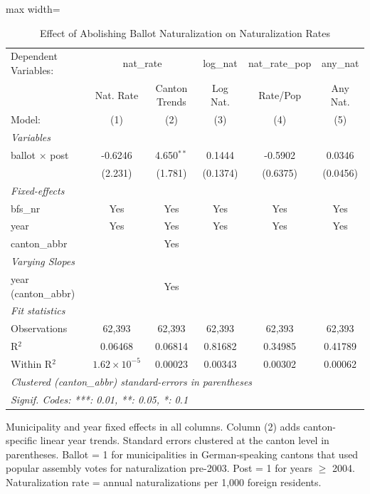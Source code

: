 
\begin{table}[htbp]
   \caption{\label{tab:main} Effect of Abolishing Ballot Naturalization on Naturalization Rates}
   \centering
   \begin{adjustbox}{max width=\textwidth}
   \begin{tabular}{lccccc}
      \tabularnewline \midrule \midrule
      Dependent Variables: & \multicolumn{2}{c}{nat\_rate} & log\_nat & nat\_rate\_pop & any\_nat\\
                            & Nat. Rate             & Canton Trends & Log Nat. & Rate/Pop & Any Nat. \\   
      Model:                & (1)                   & (2)           & (3)      & (4)      & (5)\\  
      \midrule
      \emph{Variables}\\
      ballot $\times$ post  & -0.6246               & 4.650$^{**}$  & 0.1444   & -0.5902  & 0.0346\\   
                            & (2.231)               & (1.781)       & (0.1374) & (0.6375) & (0.0456)\\   
      \midrule
      \emph{Fixed-effects}\\
      bfs\_nr               & Yes                   & Yes           & Yes      & Yes      & Yes\\  
      year                  & Yes                   & Yes           & Yes      & Yes      & Yes\\  
      canton\_abbr          &                       & Yes           &          &          & \\  
      \midrule
      \emph{Varying Slopes}\\
      year (canton\_abbr)   &                       & Yes           &          &          & \\  
      \midrule
      \emph{Fit statistics}\\
      Observations          & 62,393                & 62,393        & 62,393   & 62,393   & 62,393\\  
      R$^2$                 & 0.06468               & 0.06814       & 0.81682  & 0.34985  & 0.41789\\  
      Within R$^2$          & $1.62\times 10^{-5}$  & 0.00023       & 0.00343  & 0.00302  & 0.00062\\  
      \midrule \midrule
      \multicolumn{6}{l}{\emph{Clustered (canton\_abbr) standard-errors in parentheses}}\\
      \multicolumn{6}{l}{\emph{Signif. Codes: ***: 0.01, **: 0.05, *: 0.1}}\\
   \end{tabular}
   \end{adjustbox}

   \par \raggedright
   Municipality and year fixed effects in all columns. Column (2) adds canton-specific linear year trends. Standard errors clustered at the canton level in parentheses. Ballot = 1 for municipalities in German-speaking cantons that used popular assembly votes for naturalization pre-2003. Post = 1 for years $\geq$ 2004. Naturalization rate = annual naturalizations per 1,000 foreign residents.
\end{table}


